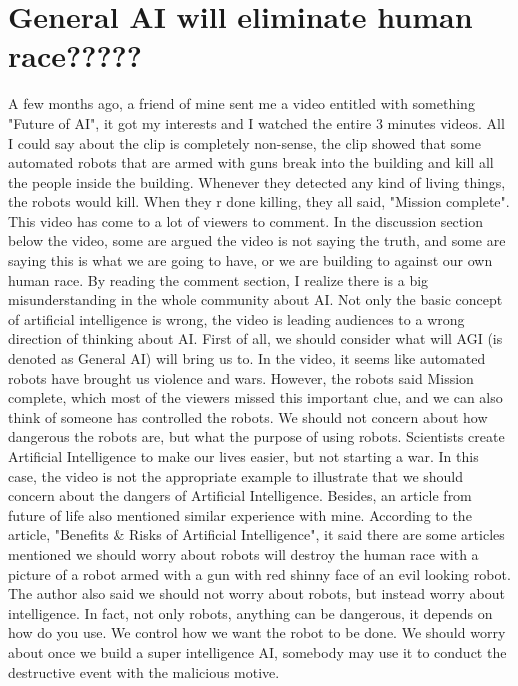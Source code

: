 \documentclass[12pt]{article}
\begin{document}
\section{General AI will eliminate human race?????}
A few months ago, a friend of mine sent me a video entitled with something "Future of AI", it got my interests and I watched the entire 3 minutes videos. All I could say about the clip is completely non-sense, the clip showed that some automated robots that are armed with guns break into the building and kill all the people inside the building. Whenever they detected any kind of living things, the robots would kill. When they r done killing, they all said, "Mission complete". This video has come to a lot of viewers to comment. In the discussion section below the video, some are argued the video is not saying the truth, and some are saying this is what we are going to have, or we are building to against our own human race. By reading the comment section, I realize there is a big misunderstanding in the whole community about AI. Not only the basic concept of artificial intelligence is wrong, the video is leading audiences to a wrong direction of thinking about AI. First of all, we should consider what will AGI (is denoted as General AI) will bring us to. In the video, it seems like automated robots have brought us violence and wars. However, the robots said Mission complete, which most of the viewers missed this important clue, and we can also think of someone has controlled the robots. We should not concern about how dangerous the robots are, but what the purpose of using robots. Scientists create Artificial Intelligence to make our lives easier, but not starting a war. In this case, the video is not the appropriate example to illustrate that we should concern about the dangers of Artificial Intelligence. Besides, an article from future of life also mentioned similar experience with mine. According to the article, "Benefits \& Risks of Artificial Intelligence", it said there are some articles mentioned we should worry about robots will destroy the human race with a picture of a robot armed with a gun with red shinny face of an evil looking robot\cite{FutureOfLife}. The author also said we should not worry about robots, but instead worry about intelligence\cite{FutureOfLife}. In fact, not only robots, anything can be dangerous, it depends on how do you use. We control how we want the robot to be done. We should worry about once we build a super intelligence AI, somebody may use it to conduct the destructive event with the malicious motive.
\end{document}
